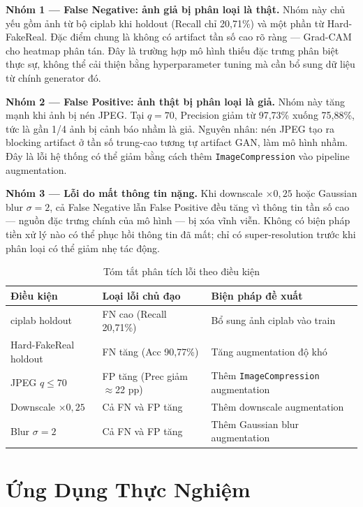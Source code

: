 \textbf{Nhóm 1 --- False Negative: ảnh giả bị phân loại là thật.}
Nhóm này chủ yếu gồm ảnh từ bộ ciplab khi holdout (Recall chỉ 20,71\%) và một phần từ Hard-FakeReal. Đặc điểm chung là không có artifact tần số cao rõ ràng --- Grad-CAM cho heatmap phân tán. Đây là trường hợp mô hình thiếu đặc trưng phân biệt thực sự, không thể cải thiện bằng hyperparameter tuning mà cần bổ sung dữ liệu từ chính generator đó.

\textbf{Nhóm 2 --- False Positive: ảnh thật bị phân loại là giả.}
Nhóm này tăng mạnh khi ảnh bị nén JPEG. Tại $q=70$, Precision giảm từ 97,73\% xuống 75,88\%, tức là gần 1/4 ảnh bị cảnh báo nhầm là giả. Nguyên nhân: nén JPEG tạo ra blocking artifact ở tần số trung-cao tương tự artifact GAN, làm mô hình nhầm. Đây là lỗi hệ thống có thể giảm bằng cách thêm \texttt{ImageCompression} vào pipeline augmentation.

\textbf{Nhóm 3 --- Lỗi do mất thông tin nặng.}
Khi downscale $\times 0{,}25$ hoặc Gaussian blur $\sigma=2$, cả False Negative lẫn False Positive đều tăng vì thông tin tần số cao --- nguồn đặc trưng chính của mô hình --- bị xóa vĩnh viễn. Không có biện pháp tiền xử lý nào có thể phục hồi thông tin đã mất; chỉ có super-resolution trước khi phân loại có thể giảm nhẹ tác động.

\begin{table}[H]
  \centering
  \caption{Tóm tắt phân tích lỗi theo điều kiện}
  \label{tab:error_analysis}
  \begin{tabularx}{\linewidth}{lXl}
    \toprule
    \textbf{Điều kiện} & \textbf{Loại lỗi chủ đạo} & \textbf{Biện pháp đề xuất} \\
    \midrule
    ciplab holdout    & FN cao (Recall 20,71\%) & Bổ sung ảnh ciplab vào train \\
    Hard-FakeReal holdout & FN tăng (Acc 90,77\%) & Tăng augmentation độ khó \\
    JPEG $q \leq 70$  & FP tăng (Prec giảm $\approx$22 pp) & Thêm \texttt{ImageCompression} augmentation \\
    Downscale $\times 0{,}25$ & Cả FN và FP tăng & Thêm downscale augmentation \\
    Blur $\sigma=2$   & Cả FN và FP tăng & Thêm Gaussian blur augmentation \\
    \bottomrule
  \end{tabularx}
\end{table}

\section{Ứng Dụng Thực Nghiệm}

